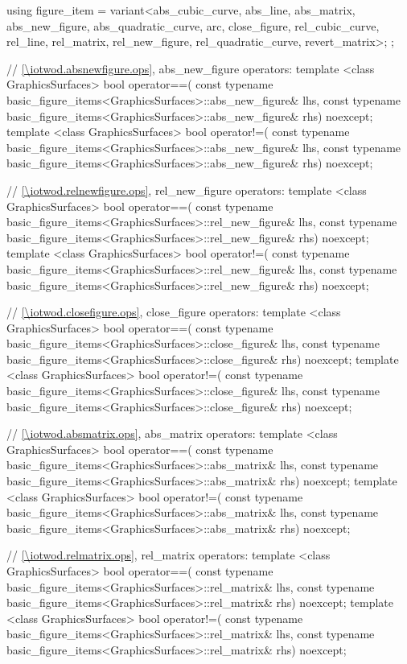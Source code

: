 \begin{codeblock}
{{    using figure_item = variant<abs_cubic_curve, abs_line, abs_matrix, abs_new_figure,
      abs_quadratic_curve, arc, close_figure, rel_cubic_curve, rel_line, rel_matrix,
      rel_new_figure, rel_quadratic_curve, revert_matrix>;
  };

  // \ref{\iotwod.absnewfigure.ops}, abs_new_figure operators:
  template <class GraphicsSurfaces>
  bool operator==(
    const typename basic_figure_items<GraphicsSurfaces>::abs_new_figure& lhs,
    const typename basic_figure_items<GraphicsSurfaces>::abs_new_figure& rhs) 
    noexcept;
  template <class GraphicsSurfaces>
  bool operator!=(
    const typename basic_figure_items<GraphicsSurfaces>::abs_new_figure& lhs,
    const typename basic_figure_items<GraphicsSurfaces>::abs_new_figure& rhs) noexcept;
  
  // \ref{\iotwod.relnewfigure.ops}, rel_new_figure operators:
  template <class GraphicsSurfaces>
  bool operator==(
    const typename basic_figure_items<GraphicsSurfaces>::rel_new_figure& lhs,
    const typename basic_figure_items<GraphicsSurfaces>::rel_new_figure& rhs) 
    noexcept;
  template <class GraphicsSurfaces>
  bool operator!=(
    const typename basic_figure_items<GraphicsSurfaces>::rel_new_figure& lhs,
    const typename basic_figure_items<GraphicsSurfaces>::rel_new_figure& rhs) 
    noexcept;

  // \ref{\iotwod.closefigure.ops}, close_figure operators:
  template <class GraphicsSurfaces>
  bool operator==(
    const typename basic_figure_items<GraphicsSurfaces>::close_figure& lhs,
    const typename basic_figure_items<GraphicsSurfaces>::close_figure& rhs) 
    noexcept;
  template <class GraphicsSurfaces>
  bool operator!=(
    const typename basic_figure_items<GraphicsSurfaces>::close_figure& lhs,
    const typename basic_figure_items<GraphicsSurfaces>::close_figure& rhs) 
    noexcept;

  // \ref{\iotwod.absmatrix.ops}, abs_matrix operators:
  template <class GraphicsSurfaces>
  bool operator==(
    const typename basic_figure_items<GraphicsSurfaces>::abs_matrix& lhs,
    const typename basic_figure_items<GraphicsSurfaces>::abs_matrix& rhs) 
    noexcept;
  template <class GraphicsSurfaces>
  bool operator!=(
    const typename basic_figure_items<GraphicsSurfaces>::abs_matrix& lhs,
    const typename basic_figure_items<GraphicsSurfaces>::abs_matrix& rhs) 
    noexcept;

  // \ref{\iotwod.relmatrix.ops}, rel_matrix operators:
  template <class GraphicsSurfaces>
  bool operator==(
    const typename basic_figure_items<GraphicsSurfaces>::rel_matrix& lhs,
    const typename basic_figure_items<GraphicsSurfaces>::rel_matrix& rhs) 
    noexcept;
  template <class GraphicsSurfaces>
  bool operator!=(
    const typename basic_figure_items<GraphicsSurfaces>::rel_matrix& lhs,
    const typename basic_figure_items<GraphicsSurfaces>::rel_matrix& rhs) 
    noexcept;

}
\end{codeblock}
